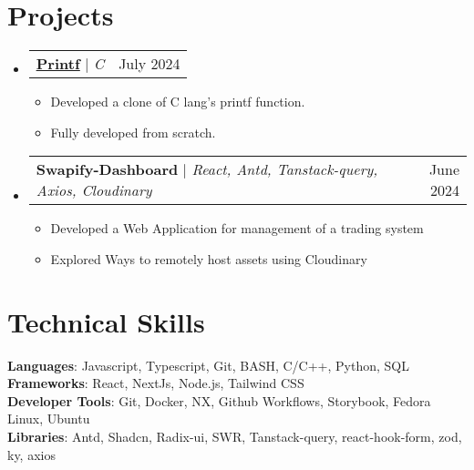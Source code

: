 \documentclass[letterpaper,11pt]{article}
\makeatletter
\newcommand{\resumeItem}[1]{
  \item\small{
    {#1 \vspace{-2pt}}
  }
}
\newcommand{\resumeSubheading}[4]{
  \vspace{-2pt}\item
    \begin{tabular*}{0.97\textwidth}[t]{l@{\extracolsep{\fill}}r}
      \textbf{#1} & #2 \\
      \textit{\small#3} & \textit{\small #4} \\
    \end{tabular*}\vspace{-7pt}
}
\newcommand{\resumeProjectHeading}[2]{
    \item
    \begin{tabular*}{0.97\textwidth}{l@{\extracolsep{\fill}}r}
      \small#1 & #2 \\
    \end{tabular*}\vspace{-7pt}
}
\newcommand{\resumeSubHeadingListStart}{\begin{itemize}[leftmargin=0.15in, label={}]}
\newcommand{\resumeSubHeadingListEnd}{\end{itemize}}
\newcommand{\resumeItemListStart}{\begin{itemize}}
\newcommand{\resumeItemListEnd}{\end{itemize}\vspace{-5pt}}
\makeatother
\begin{document}



\section{Projects}
\resumeSubHeadingListStart
\resumeProjectHeading
{\textbf{\href{https://github.com/Antonious-Awad/printf}{\underline{Printf}}} $|$ \emph{C}}{July 2024}
\resumeItemListStart
\resumeItem{Developed a clone of C lang's printf function.}
\resumeItem{Fully developed from scratch.}
\resumeItemListEnd
\resumeProjectHeading
{\textbf{Swapify-Dashboard} $|$ \emph{React, Antd, Tanstack-query, Axios, Cloudinary}}{June 2024}
\resumeItemListStart
\resumeItem{Developed a Web Application for management of a trading system }
\resumeItem{Explored Ways to remotely host assets using Cloudinary}
\resumeItemListEnd
\resumeSubHeadingListEnd



%
\section{Technical Skills}
\begin{itemize}[leftmargin=0.15in, label={}]
  \small{\item{
        \textbf{Languages}{: Javascript, Typescript, Git, BASH, C/C++, Python, SQL} \\
        \textbf{Frameworks}{: React, NextJs, Node.js, Tailwind CSS } \\
        \textbf{Developer Tools}{: Git, Docker, NX, Github Workflows, Storybook, Fedora Linux, Ubuntu} \\
        \textbf{Libraries}{: Antd, Shadcn, Radix-ui, SWR, Tanstack-query, react-hook-form, zod, ky, axios}
        }}
\end{itemize}


\end{document}
